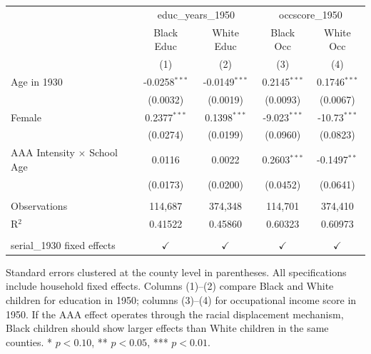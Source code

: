 
\begingroup
\centering
\begin{tabular}{lcccc}
   \toprule
    & \multicolumn{2}{c}{educ\_years\_1950} & \multicolumn{2}{c}{occscore\_1950}\\
                                      & Black Educ      & White Educ      & Black Occ      & White Occ \\   
                                      & (1)             & (2)             & (3)            & (4)\\  
   \midrule 
   Age in 1930                        & -0.0258$^{***}$ & -0.0149$^{***}$ & 0.2145$^{***}$ & 0.1746$^{***}$\\   
                                      & (0.0032)        & (0.0019)        & (0.0093)       & (0.0067)\\   
   Female                             & 0.2377$^{***}$  & 0.1398$^{***}$  & -9.023$^{***}$ & -10.73$^{***}$\\   
                                      & (0.0274)        & (0.0199)        & (0.0960)       & (0.0823)\\   
   AAA Intensity $\times$ School Age  & 0.0116          & 0.0022          & 0.2603$^{***}$ & -0.1497$^{**}$\\   
                                      & (0.0173)        & (0.0200)        & (0.0452)       & (0.0641)\\   
    \\
   Observations                       & 114,687         & 374,348         & 114,701        & 374,410\\  
   R$^2$                              & 0.41522         & 0.45860         & 0.60323        & 0.60973\\  
    \\
   serial\_1930 fixed effects         & $\checkmark$    & $\checkmark$    & $\checkmark$   & $\checkmark$\\   
   \bottomrule
\end{tabular}
 
\par \raggedright 
Standard errors clustered at the county level in parentheses. All specifications include household fixed effects. Columns (1)--(2) compare Black and White children for education in 1950; columns (3)--(4) for occupational income score in 1950. If the AAA effect operates through the racial displacement mechanism, Black children should show larger effects than White children in the same counties. * $p<0.10$, ** $p<0.05$, *** $p<0.01$.
\par\endgroup


